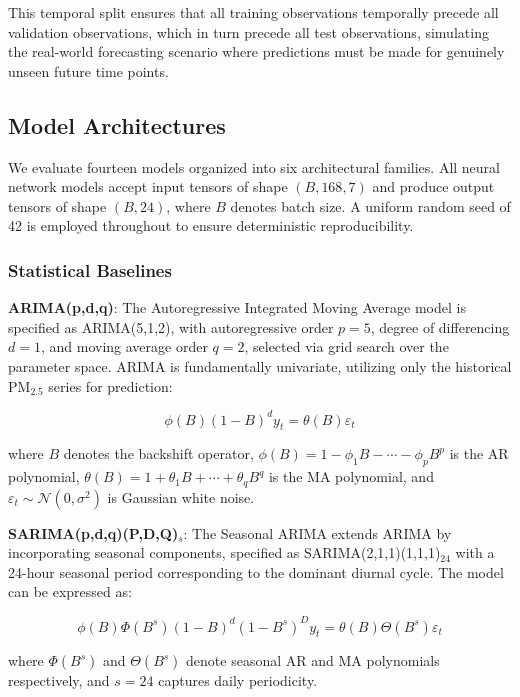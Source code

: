 \documentclass[conference]{IEEEtran}
\begin{document}
This temporal split ensures that all training observations temporally precede all validation observations, which in turn precede all test observations, simulating the real-world forecasting scenario where predictions must be made for genuinely unseen future time points.

\subsection{Model Architectures}

We evaluate fourteen models organized into six architectural families. All neural network models accept input tensors of shape $(B, 168, 7)$ and produce output tensors of shape $(B, 24)$, where $B$ denotes batch size. A uniform random seed of 42 is employed throughout to ensure deterministic reproducibility.

\subsubsection{Statistical Baselines}

\textbf{ARIMA(p,d,q)}: The Autoregressive Integrated Moving Average model is specified as ARIMA(5,1,2), with autoregressive order $p=5$, degree of differencing $d=1$, and moving average order $q=2$, selected via grid search over the parameter space. ARIMA is fundamentally univariate, utilizing only the historical PM$_{2.5}$ series for prediction:

\begin{equation}
\phi(B)(1-B)^{d} y_t = \theta(B)\varepsilon_t
\label{eq:arima}
\end{equation}

where $B$ denotes the backshift operator, $\phi(B) = 1 - \phi_1 B - \cdots - \phi_p B^{p}$ is the AR polynomial, $\theta(B) = 1 + \theta_1 B + \cdots + \theta_q B^{q}$ is the MA polynomial, and $\varepsilon_t \sim \mathcal{N}(0, \sigma^{2})$ is Gaussian white noise.

\textbf{SARIMA(p,d,q)(P,D,Q)$_s$}: The Seasonal ARIMA extends ARIMA by incorporating seasonal components, specified as SARIMA(2,1,1)(1,1,1)$_{24}$ with a 24-hour seasonal period corresponding to the dominant diurnal cycle. The model can be expressed as:

\begin{equation}
\phi(B)\Phi(B^{s})(1-B)^{d}(1-B^{s})^{D} y_t = \theta(B)\Theta(B^{s})\varepsilon_t
\label{eq:sarima}
\end{equation}

where $\Phi(B^{s})$ and $\Theta(B^{s})$ denote seasonal AR and MA polynomials respectively, and $s=24$ captures daily periodicity.
\end{document}
